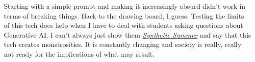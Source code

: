 Starting with a simple prompt and making it increasingly absurd didn't
work in terms of breaking things. Back to the drawing board, I guess.
Testing the limits of this tech does help when I have to deal with
students asking questions about Generative AI. I can't always just show
them
\href{https://arstechnica.com/information-technology/2023/05/ai-generated-beer-commercial-contains-joyful-monstrosities-goes-viral/}{\emph{Synthetic
Summer}} and say that this tech creates monstrosities. It is constantly
changing and society is really, really not ready for the implications of
what may result.
